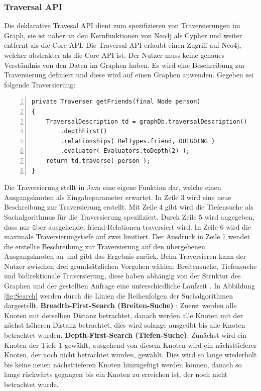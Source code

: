 \subsubsection{Traversal API}
Die deklarative Travesal API dient zum spezifizieren von Traversierungen im Graph, sie ist näher an den Kernfunktionen von Neo4j als Cypher und weiter entfernt als die Core API. Die Traversal API erlaubt einen Zugriff auf Neo4j, welcher  abstrakter als die Core API ist. Der Nutzer muss keine genaues Verständnis von den Daten im Graphen haben. Es wird eine Beschreibung zur Traversierung  definiert und diese wird auf einen Graphen anwenden. Gegeben sei folgende Traversierung:
\begin{Verbatim}[frame=single,numbers=left,xleftmargin=5mm]
private Traverser getFriends(final Node person)
{
	TraversalDescription td = graphDb.traversalDescription()
		.depthFirst()
		.relationships( RelTypes.friend, OUTGOING )
		.evaluator( Evaluators.toDepth(2) );
	return td.traverse( person );
}
\end{Verbatim}
Die Traversierung stellt in Java eine eigene Funktion dar, welche einen Ausgangsknoten als Eingabeparameter erwartet. In Zeile 3 wird eine neue Beschreibung zur Traversierung erstellt. Mit Zeile 4 gibt wird die Tiefensuche als Suchalgorithmus für die Traversierung spezifiziert. Durch Zeile 5 wird angegeben, dass nur über ausgehende, friend-Relationen traversiert wird. In Zeile 6  wird die maximale Traversierungstiefe auf zwei limitiert. Der Ausdruck in Zeile 7 wendet die erstellte Beschreibung zur Traversierung auf den übergebenen Ausgangsknoten an und gibt das Ergebnis zurück. \newline
Beim Traversieren kann der  Nutzer zwischen drei grundsätzlichen Vorgehen wählen: Breitensuche, Tiefensuche und bidirektionale Traversierung, diese haben abhängig von der Struktur des Graphen und der gestellten Anfrage eine unterschiedliche Laufzeit \parencite{vukotic2015neo4j}. In  Abbildung \ref{fig:Search} werden durch die Linien die Reihenfolgen der Suchalgorithmen dargestellt. \newline
\textbf {Breadth-First-Search (Breiten-Suche)} : Zuerst werden alle Knoten mit derselben Distanz betrachtet, danach werden alle Knoten mit der nächst höheren Distanz betrachtet, dies wird solange ausgeübt bis alle Knoten betrachtet wurden. \newline
\textbf {Depth-First-Search (Tiefen-Suche)}: Zunächst wird ein Knoten der Tiefe 1 gewählt, ausgehend von diesem Knoten wird ein nächsttieferer Knoten, der noch nicht betrachtet wurden, gewählt. Dies wird so lange wiederholt bis keine neuen nächsttieferen Knoten hinzugefügt werden können, danach so lange rückwärts gegangen bis ein Knoten zu erreichen ist, der noch nicht betrachtet wurde. \newline
